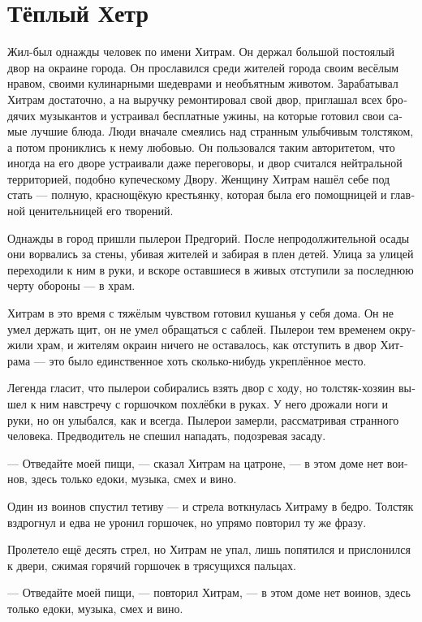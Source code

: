 \documentclass[a4paper,12pt,fleqn]{book}\usepackage{polyglossia}\setdefaultlanguage[babelshorthands=true]{russian}\setotherlanguage{english}\defaultfontfeatures{Ligatures=TeX,Mapping=tex-text}\usepackage{xcolor}\newcommand{\ml}[3]{#2}
\begin{document}
{\section{Тёплый Хетр}

Жил-был однажды человек по имени Хитрам.
Он держал большой постоялый двор на окраине города.
Он прославился среди жителей города своим весёлым нравом, своими кулинарными шедеврами и необъятным животом.
Зарабатывал Хитрам достаточно, а на выручку ремонтировал свой двор, приглашал всех бродячих музыкантов и устраивал бесплатные ужины, на которые готовил свои самые лучшие блюда.
Люди вначале смеялись над странным улыбчивым толстяком, а потом прониклись к нему любовью.
Он пользовался таким авторитетом, что иногда на его дворе устраивали даже переговоры, и двор считался нейтральной территорией, подобно купеческому Двору.
Женщину Хитрам нашёл себе под стать --- полную, краснощёкую крестьянку, которая была его помощницей и главной ценительницей его творений.

Однажды в город пришли пылерои Предгорий.
После непродолжительной осады они ворвались за стены, убивая жителей и забирая в плен детей.
Улица за улицей переходили к ним в руки, и вскоре оставшиеся в живых отступили за последнюю черту обороны --- в храм.

Хитрам в это время с тяжёлым чувством готовил кушанья у себя дома.
Он не умел держать щит, он не умел обращаться с саблей.
Пылерои тем временем окружили храм, и жителям окраин ничего не оставалось, как отступить в двор Хитрама --- это было единственное хоть сколько-нибудь укреплённое место.

Легенда гласит, что пылерои собирались взять двор с ходу, но толстяк-хозяин вышел к ним навстречу с горшочком похлёбки в руках.
У него дрожали ноги и руки, но он улыбался, как и всегда.
Пылерои замерли, рассматривая странного человека.
Предводитель не спешил нападать, подозревая засаду.

--- Отведайте моей пищи, --- сказал Хитрам на цатроне, --- в этом доме нет воинов, здесь только едоки, музыка, смех и вино.

Один из воинов спустил тетиву --- и стрела воткнулась Хитраму в бедро.
Толстяк вздрогнул и едва не уронил горшочек, но упрямо повторил ту же фразу.

Пролетело ещё десять стрел, но Хитрам не упал, лишь попятился и прислонился к двери, сжимая горячий горшочек в трясущихся пальцах.

--- Отведайте моей пищи, --- повторил Хитрам, --- в этом доме нет воинов, здесь только едоки, музыка, смех и вино.

}
\end{document}
